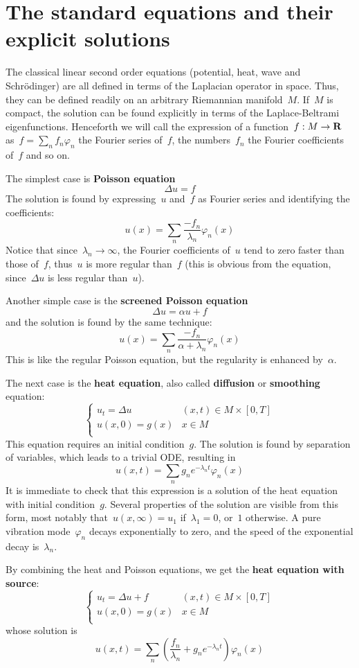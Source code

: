 \section{The standard equations and their explicit solutions}

The classical linear second order equations (potential, heat, wave and
Schrödinger) are all defined in terms of the Laplacian operator in space.
Thus, they can be defined readily on an arbitrary Riemannian manifold~$M$.
If~$M$ is compact, the solution can be found explicitly in terms of the
Laplace-Beltrami eigenfunctions.  Henceforth we will call the expression of a
function~$f:M\to\mathbf{R}$ as~$f=\sum_nf_n\varphi_n$ the Fourier series of~$f$, the
numbers~$f_n$ the Fourier coefficients of~$f$ and so on.

The simplest case is {\bf Poisson equation}
$$
	\Delta u = f
$$
The solution is found by expressing~$u$ and~$f$ as Fourier series and
identifying the coefficients:
$$
u(x) = \sum_n\frac{-f_n}{\lambda_n}\varphi_n(x)
$$
Notice that since~$\lambda_n\to\infty$, the Fourier coefficients of~$u$ tend
to zero faster than those of~$f$, thus~$u$ is more regular than~$f$
(this is obvious from the equation, since~$\Delta u$ is less regular than~$u$).

Another simple case is the {\bf screened Poisson equation}
$$
\Delta u = \alpha u + f
$$
and the solution is found by the same technique:
$$
u(x) = \sum_n\frac{-f_n}{\alpha+\lambda_n}\varphi_n(x)
$$
This is like the regular Poisson equation, but the regularity is enhanced
by~$\alpha$.

The next case is the {\bf heat equation}, also called {\bf diffusion} or {\bf
smoothing} equation:
$$
\begin{cases}
	u_t = \Delta u & (x,t)\in M\times[0,T] \\
	u(x,0)=g(x) & x\in M\\
\end{cases}
$$
This equation requires an initial condition~$g$.  The solution is found by
separation of variables, which leads to a trivial ODE, resulting in
$$
u(x,t)=\sum_ng_ne^{-{\lambda_n}t}\varphi_n(x)
$$
It is immediate to check that this expression is a solution of the heat
equation with initial condition~$g$.  Several properties of the solution are
visible from this form, most notably that~$u(x,\infty)=u_1$ if~$\lambda_1=0$,
or~$1$ otherwise.  A pure vibration mode~$\varphi_n$ decays exponentially to
zero, and the speed of the exponential decay is~$\lambda_n$.

By combining the heat and Poisson equations, we get the {\bf heat equation
with source}:
$$
\begin{cases}
	u_t = \Delta u + f & (x,t)\in M\times[0,T] \\
	u(x,0)=g(x) & x\in M\\
\end{cases}
$$
whose solution is
$$
u(x,t)=\sum_n\left(
\frac{f_n}{\lambda_n}+g_ne^{-{\lambda_n}t}
\right)\varphi_n(x)
$$


